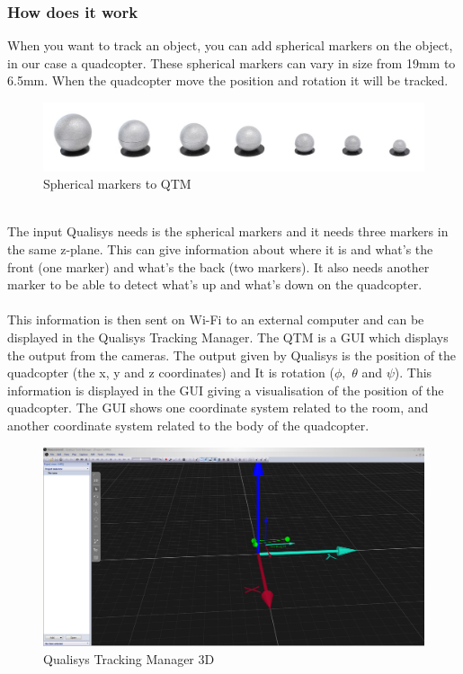 \subsubsection{How does it work}
When you want to track an object, you can add spherical markers on the object, in our case a quadcopter. These spherical markers can vary in size from 19mm to 6.5mm. When the quadcopter move the position and rotation it will be tracked. \\
\begin{figure}[h]
          \centering
            \includegraphics[scale = 0.35]{VAPIQ-PICTURES/sphere.png}
                \caption{Spherical markers to QTM}
                \label{sphere}
            \label{dir}
\end{figure}
\\
The input Qualisys needs is the spherical markers and it needs three markers in the same z-plane. This can give information about where it is and what’s the front (one marker) and what’s the back (two markers). It also needs another marker to be able to detect what’s up and what’s down on the quadcopter. 
\\\\
This information is then sent on Wi-Fi to an external computer and can be displayed in the Qualisys Tracking Manager. The QTM is a GUI which displays the output from the cameras. The output given by Qualisys is the position of the quadcopter (the x, y and z coordinates) and It is rotation ($ \phi,$ $ \theta $ and $ \psi $). This information is displayed in the GUI giving a visualisation of the position of the quadcopter. The GUI shows one coordinate system related to the room, and another coordinate system related to the body of the quadcopter.
\begin{figure}[ht]
          \centering
            \includegraphics[scale = 0.25]{VAPIQ-PICTURES/qtm.png}
                \caption{Qualisys Tracking Manager 3D}
                \label{qtm3d}
            \label{dir}
\end{figure}
